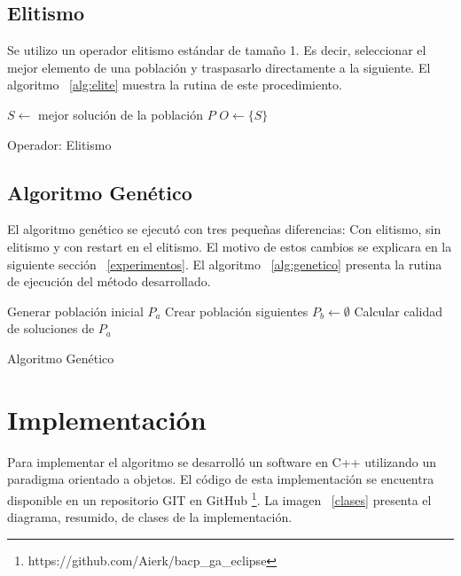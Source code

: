 \documentclass[letter, 10pt]{article}
\begin{document}
\subsection{Elitismo}
Se utilizo un operador elitismo estándar de tamaño 1. Es decir, seleccionar el
mejor elemento de una población y traspasarlo directamente a la siguiente.  El
algoritmo ~\ref{alg:elite} muestra la rutina de este procedimiento.

\begin{algorithm}[H]
\SetLine
{}

$S \gets$ mejor solución de la población $P$ \;
$O \gets \{S\}$ \;

\caption{Operador: Elitismo}
\label{alg:elite}
\end{algorithm}

\subsection{Algoritmo Genético}
El algoritmo genético se ejecutó con tres pequeñas diferencias: Con elitismo,
sin elitismo y con restart en el elitismo.  El motivo de estos cambios se
explicara en la siguiente sección ~\ref{experimentos}. El algoritmo
~\ref{alg:genetico} presenta la rutina de ejecución del método desarrollado.

\begin{algorithm}[H]
\SetLine
{}

Generar población inicial $P_{a}$ \;
Crear población siguientes $P_{b} \gets \emptyset$ \;
Calcular calidad de soluciones de $P_{a}$ \;
\caption{Algoritmo Genético}
\label{alg:genetico}
\end{algorithm}

\section{Implementación}
Para implementar el algoritmo se desarrolló un software en C++ utilizando un
paradigma orientado a objetos. El código de esta implementación se encuentra
disponible en un repositorio GIT en
GitHub \footnote{https://github.com/Aierk/bacp\_ga\_eclipse}. La imagen
~\ref{clases} presenta el diagrama, resumido, de clases de la implementación.
\end{document}
